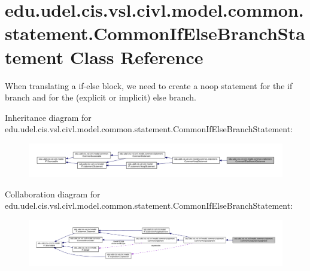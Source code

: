 \hypertarget{classedu_1_1udel_1_1cis_1_1vsl_1_1civl_1_1model_1_1common_1_1statement_1_1CommonIfElseBranchStatement}{}\section{edu.\+udel.\+cis.\+vsl.\+civl.\+model.\+common.\+statement.\+Common\+If\+Else\+Branch\+Statement Class Reference}
\label{classedu_1_1udel_1_1cis_1_1vsl_1_1civl_1_1model_1_1common_1_1statement_1_1CommonIfElseBranchStatement}


When translating a if-\/else block, we need to create a noop statement for the if branch and for the (explicit or implicit) else branch.  




Inheritance diagram for edu.\+udel.\+cis.\+vsl.\+civl.\+model.\+common.\+statement.\+Common\+If\+Else\+Branch\+Statement\+:
\nopagebreak
\begin{figure}[H]
\begin{center}
\leavevmode
\includegraphics[width=350pt]{classedu_1_1udel_1_1cis_1_1vsl_1_1civl_1_1model_1_1common_1_1statement_1_1CommonIfElseBranchStatement__inherit__graph}
\end{center}
\end{figure}


Collaboration diagram for edu.\+udel.\+cis.\+vsl.\+civl.\+model.\+common.\+statement.\+Common\+If\+Else\+Branch\+Statement\+:
\nopagebreak
\begin{figure}[H]
\begin{center}
\leavevmode
\includegraphics[width=350pt]{classedu_1_1udel_1_1cis_1_1vsl_1_1civl_1_1model_1_1common_1_1statement_1_1CommonIfElseBranchStatement__coll__graph}
\end{center}
\end{figure}
